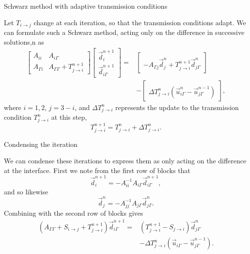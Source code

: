 \documentclass{beamer}
\begin{document}
\begin{frame}{Schwarz method with adaptive transmission conditions}

Let $T_{i \to j}$ change at each iteration, so that the transmission conditions adapt.
We can formulate such a Schwarz method, acting only on the difference in successive solutions,n as
\begin{align*}
	\begin{bmatrix} A_{ii} & A_{i \Gamma} \\ A_{\Gamma i} & A_{\Gamma \Gamma} + T_{j \to i}^{n+1} \end{bmatrix}
	\begin{bmatrix} \vec{d}_i^{n+1} \\ \vec{d}_{i \Gamma}^{n+1} \end{bmatrix}
	= & \begin{bmatrix} ~ \\ -A_{\Gamma j} \vec{d}_j^n + T_{j \to i}^{n+1} \vec{d}_{j \Gamma}^n \end{bmatrix} \\
	& - \begin{bmatrix} ~ \\ \Delta T_{j \to i}^n \left ( \vec{u}_{i \Gamma}^n - \vec{u}_{j \Gamma}^{n-1} \right ) \end{bmatrix},
\end{align*}
where $i=1,2$, $j=3-i$, and $\Delta T_{j \to i}^n$ represents the update to the transmission condition $T_{j \to i}^n$ at this step,
\begin{equation*}
	T_{j \to i}^{n+1} = T_{j \to i}^n + \Delta T_{j \to i}^n.
\end{equation*}
\end{frame}

\begin{frame}{Condensing the iteration}

We can condense these iterations to express them as only acting on the difference at the interface.
First we note from the first row of blocks that
\begin{equation*}
	\vec{d}_i^{n+1} = -A_{ii}^{-1} A_{i \Gamma} \vec{d}_{i \Gamma}^{n+1},
\end{equation*}
and so likewise
\begin{equation*}
	\vec{d}_j^{n} = -A_{jj}^{-1} A_{j \Gamma} \vec{d}_{j \Gamma}^{n}.
\end{equation*}
Combining with the second row of blocks gives
\begin{align*}
	\left ( A_{\Gamma \Gamma} + S_{i \to j} + T_{j \to i}^{n+1} \right ) \vec{d}_{i \Gamma}^{n+1} =
	& \left ( T_{j \to i}^{n+1} - S_{j \to i} \right ) \vec{d}_{j \Gamma}^n \\
	& - \Delta T_{j \to i}^n \left ( \vec{u}_{i \Gamma} - \vec{u}_{j \Gamma}^{n-1} \right ).
\end{align*}
\end{frame}
\end{document}
